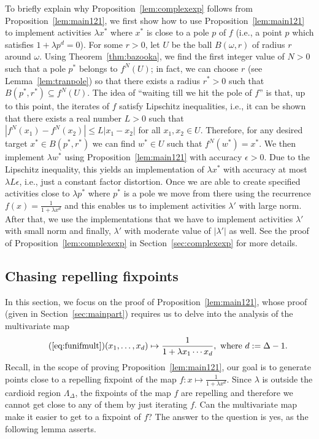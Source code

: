 \documentclass[11pt]{article}
\def\LambdaD{\Lambda_\Delta}
\newcommand{\fn}[2]{#1^{#2}}
\begin{document}
To briefly explain why Proposition~\ref{lem:complexexp} follows from  Proposition~\ref{lem:main121}, we first show how to use  Proposition~\ref{lem:main121} to implement activities 
$\lambda x^*$ where $x^*$ is
close to a pole $p$ of $f$ (i.e., a point $p$ which  satisfies $1+\lambda p^d=0$). For some $r>0$, let $U$ be the ball $B(\omega,r)$ of radius $r$ around $\omega$. Using Theorem~\ref{thm:bazooka}, we find the first integer value of $N>0$ such that a pole $p^*$ belongs to $\fn{f}{N}(U)$; in fact, we can choose $r$ (see Lemma~\ref{lem:tranpole}) so that there exists a radius $r^*>0$ such that $B(p^*,r^*)\subseteq\fn{f}{N}(U)$. The idea of ``waiting till we hit the pole of $f$'' is that, up to this point, the iterates of $f$ satisfy Lipschitz inequalities, i.e., it can be shown that there exists a  real number $L>0$ such that $|\fn{f}{N}(x_1)-\fn{f}{N}(x_2)|\leq L|x_1-x_2|$ for all $x_1,x_2\in U$. 
Therefore, for any desired target $x^*\in B(p^*,r^*)$ we can find $w^*\in U$ such that $\fn{f}{N}(w^*)=x^*$.
We then
implement $\lambda w^*$ using  Proposition~\ref{lem:main121} with accuracy $\epsilon>0$.
Due to the Lipschitz inequality, this yields an implementation of $\lambda x^*$ with accuracy at most $\lambda L\epsilon$, i.e., just a constant factor distortion. 
Once we are able to create specified activities 
close to 
$\lambda p^*$ where $p^*$ is a pole
we move from there using the recurrence 
$f(x)=\frac{1}{1+\lambda x^d}$
and this enables us to  implement activities $\lambda'$ with large norm.
 After that, we use the implementations that we have  to implement activities $\lambda'$ with small norm and finally, $\lambda'$ with moderate value of $|\lambda'|$ as well. See the proof of Proposition~\ref{lem:complexexp} in Section~\ref{sec:complexexp} for more details.
 

\subsection{Chasing repelling fixpoints}\label{sec:chasing}

In this section, we focus on the proof of  Proposition~\ref{lem:main121}, whose proof 
(given in Section~\ref{sec:mainpart})
requires us to delve into the analysis of the multivariate map
\begin{equation*}\tag{\ref{eq:funifmult}}
(x_1,\hdots,x_{d})\mapsto \frac{1}{1+\lambda x_1\cdots x_d }, \mbox{ where } d:=\Delta-1.
\end{equation*} 
Recall, in the scope of proving  Proposition~\ref{lem:main121}, our goal is to generate points close to a repelling fixpoint of the map $f:x\mapsto \frac{1}{1+\lambda x^d}$. Since $\lambda$ is outside the cardioid region $\LambdaD$, the fixpoints of the map $f$ are repelling and therefore we cannot get close to any of them by just iterating $f$. 
Can the multivariate map  make it easier to get to
a fixpoint of $f$? The answer to the question is yes, as the following lemma asserts.
\end{document}
